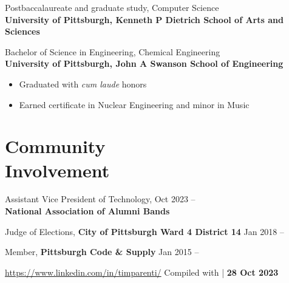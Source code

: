 \documentclass[11pt]{article}
\newcommand{\lmr}{\fontfamily{lmr}\selectfont} %
\newcommand{\textdb}[1]{\fontseries{db}\selectfont#1\normalfont}
\newcommand{\present}{\phantom{Xxx 20XX}}
\begin{document}
\textdb{
Postbaccalaureate and graduate study, Computer Science
	\\
}
\textbf{University of Pittsburgh, Kenneth P Dietrich School of Arts and Sciences}

\textdb{
Bachelor of Science in Engineering, Chemical Engineering
	\\
}
\textbf{University of Pittsburgh, John A Swanson School of Engineering}
\begin{itemize}
	\item Graduated with \emph{cum laude} honors
	\item Earned certificate in Nuclear Engineering and minor in Music
\end{itemize}



\section{Community\\ Involvement}

\textdb{
Assistant Vice President of Technology,
	\hfill Oct 2023 -- \present \\
}
\textbf{National Association of Alumni Bands}

\textdb{
Judge of Elections,
\textbf{City of Pittsburgh Ward 4 District 14}
	\hfill Jan 2018 -- \present
}

\textdb{
Member,
\textbf{Pittsburgh Code \& Supply}
	\hfill Jan 2015 -- \present
}



\begin{adjustwidth}{-1in}{0pt}
	\hrulefill \par
	\hypersetup{linkcolor=gray}
	\small
	\url{https://www.linkedin.com/in/timparenti/} \hfill {\lmr Compiled with \XeLaTeX} | \textbf{28 Oct 2023}
\end{adjustwidth}
\end{document}
